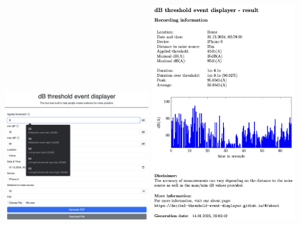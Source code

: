 \includegraphics[width=0.475\textwidth]{../assets/abstract_application_screenshot.png}
\includegraphics[width=0.475\textwidth]{../assets/abstract_report_screenshot.png}

\pagebreak
